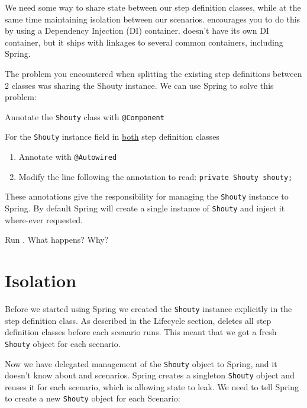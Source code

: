 We need some way to share state between our step definition classes, while at the same time maintaining isolation between our scenarios. \CUKE{} encourages you to do this by using a Dependency Injection (DI) container. \CUKE{} doesn't have its own DI container, but it ships with linkages to several common containers, including Spring.

The problem you encountered when splitting the existing step definitions between 2 classes was sharing the Shouty instance. We can use Spring to solve this problem:



\begin{itemize}
    \CYBERDOJO
        {}
        {\item Annotate the \texttt{Shouty} class with \texttt{@Component}}
    \item For the \texttt{Shouty} instance field in \underline{both} step definition classes 
    \begin{enumerate}
        \item Annotate with \texttt{@Autowired}
        \item Modify the line following the annotation to read: \texttt{private Shouty shouty;}
    \end{enumerate}
\end{itemize}

These annotations give the responsibility for managing the \texttt{Shouty} instance to Spring. By default Spring will create a single instance of \texttt{Shouty} and inject it where-ever requested.

Run \CUKE{}. What happens? Why?



\section*{Isolation}

Before we started using Spring we created the \texttt{Shouty} instance explicitly in the step definition class. As described in the \CUKE{} Lifecycle section, \CUKE{} deletes all step definition classes before each scenario runs. This meant that we got a fresh \texttt{Shouty} object for each scenario.

Now we have delegated management of the \texttt{Shouty} object to Spring, and it doesn't know about \CUKE{} and scenarios. Spring creates a singleton \texttt{Shouty} object and reuses it for each scenario, which is allowing state to leak. We need to tell Spring to create a new \texttt{Shouty} object for each Scenario:

